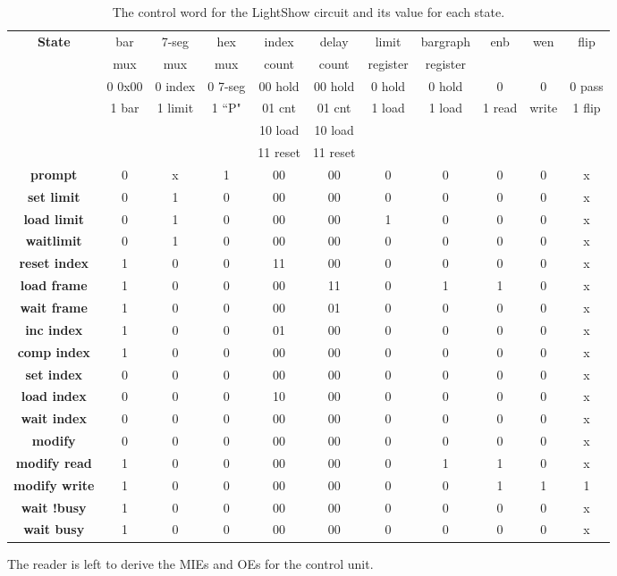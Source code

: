 \begin{table}
{\tiny
\begin{tabular}{c||c|c|c|c|c|c|c|c|c|c}
\textbf{ State } 	& bar & 7-seg & hex & index & delay & limit    & bargraph & enb & wen   & flip \\  
	                & mux & mux   & mux & count & count & register & register &          &         &       \\  \hline \hline
	& 0 0x00 & 0 index & 0 7-seg & 00 hold & 00 hold & 0 hold & 0 hold   & 0       & 0       &0 pass \\ 
	& 1 bar	& 1 limit & 1 ``P"& 01 cnt & 01 cnt & 1 load &    1 load              & 1 read & write   & 1 flip \\
	& 	&     &     & 10 load & 10 load & & &  \\
	& 	&     &	    & 11 reset	& 11 reset & & \\ \hline \hline
\textbf{ prompt } 	 & 	0 &	x &	1 &	00 &	00 &	0 &	0 &	0 &	0 & x \\ \hline
\textbf{ set limit }  & 	0 &	1 &	0 &	00 &	00 &	0 &	0 &	0 &	0 & x \\ \hline
\textbf{ load limit } &	0 &	1 &	0 &	00 &	00 &	1 &	0 &	0 &	0 & x \\ \hline
\textbf{ waitlimit } &	0 &	1 &	0 &	00 &	00 &	0 &	0 &	0 &	0 & x \\ \hline
\textbf{ reset index } &	1 &	0 & 	0 &	11 &	00 &	0 &	0 &	0 &	0 & x \\ \hline
\textbf{ load frame } &	1 &	0 &	0 &	00 &	11 &	0 &	1 &	1 &	0 & x \\ \hline
\textbf{ wait frame } &	1 &	0 &	0 &	00 &	01 &	0 &	0 &	0 &	0 & x \\ \hline
\textbf{ inc index } &	1 &	0 &	0 &	01 &	00 &	0 &	0 &	0 &	0 & x \\ \hline
\textbf{ comp index } &	1 &	0 &	0 &	00 &	00 &	0 &	0 &	0 &	0 & x \\ \hline
\textbf{ set index } &	0 &	0 &	0 &	00 & 	00 &	0 & 	0 &	0 &	0 & x \\ \hline
\textbf{ load index } &	0 &	0 & 	0 &	10 &	00 &	0 &	0 &	0 & 0 & x \\ \hline
\textbf{ wait index } &	0 &	0 &	0 &	00 &	00 &	0 &	0 &	0 &	0 & x \\ \hline
\textbf{ modify	} &	0 &	0 &	0 &	00 &	00 &	0 &	0 &	0 &	0 & x \\ \hline
\textbf{ modify read} &	1 &	0 &	0 &	00 &	00 &	0 &	1 &	1 &	0 & x \\ \hline
\textbf{ modify write } &	1 &	0 &	0 &	00 &	00 &	0 &	0 & 	1 &	1 & 1 \\ \hline
\textbf{ wait !busy } &	1 &	0 &	0 &	00 &	00 &	0 &	0 &	0 &	0 & x \\ \hline
\textbf{ wait busy } &	1 &	0 &	0 &	00 &	00 &	0 &	0 &	0 &	0 & x \\ 
\end{tabular} 
}
\caption{The control word for the LightShow circuit and its value for each state.}
\label{table:LightShow}
\end{table}

The reader is left to derive the MIEs and OEs for the control unit.

